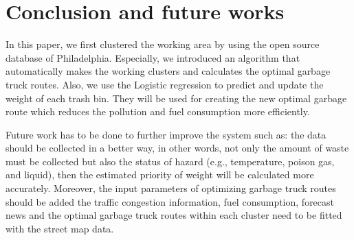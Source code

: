 \documentclass[conference]{IEEEtran}
\begin{document}
\section{Conclusion and future works}
\label{section4}

In this paper, we first clustered the working area by using the open source database of Philadelphia. Especially, we introduced an algorithm that automatically makes the working clusters and calculates the optimal garbage truck routes. Also, we use the Logistic regression to predict and update the weight of each trash bin. They will be used for creating the new optimal garbage route which reduces the pollution and fuel consumption more efficiently.  

Future work has to be done to further improve the system such as: the data should be collected in a better  way, in other words, not only the amount of waste must be collected but also the status of hazard (e.g., temperature, poison gas, and liquid), then the estimated priority of weight will be calculated more accurately. Moreover, the input parameters of optimizing garbage truck routes should be added the traffic congestion information, fuel consumption, forecast news and the optimal garbage truck routes within each cluster need to be fitted with the street map data. 


%
%

\end{document}
